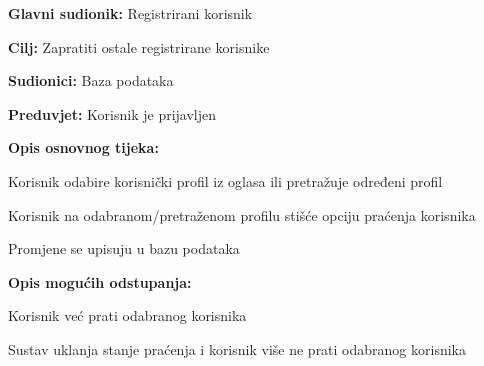 				\noindent {}
					\begin{packed_item}
	
						\item \textbf{Glavni sudionik: }Registrirani korisnik
						\item  \textbf{Cilj:} Zapratiti ostale registrirane korisnike
						\item  \textbf{Sudionici:} Baza podataka
						\item  \textbf{Preduvjet:} Korisnik je prijavljen
						\item  \textbf{Opis osnovnog tijeka:}
						
						\item[] \begin{packed_enum}
	
							\item Korisnik odabire korisnički profil iz oglasa ili pretražuje određeni profil
							\item Korisnik na odabranom/pretraženom profilu stišće opciju praćenja korisnika
							\item Promjene se upisuju u bazu podataka
							
							\item  \textbf{Opis mogućih odstupanja:}
						
						\item[] \begin{packed_item}
	
							\item[2.a] Korisnik već prati odabranog korisnika
								\begin{packed_item}
									\item Sustav uklanja stanje praćenja i korisnik više ne prati odabranog korisnika
								\end{packed_item}
						\end{packed_item} 

						\end{packed_enum}						
					\end{packed_item}
					
